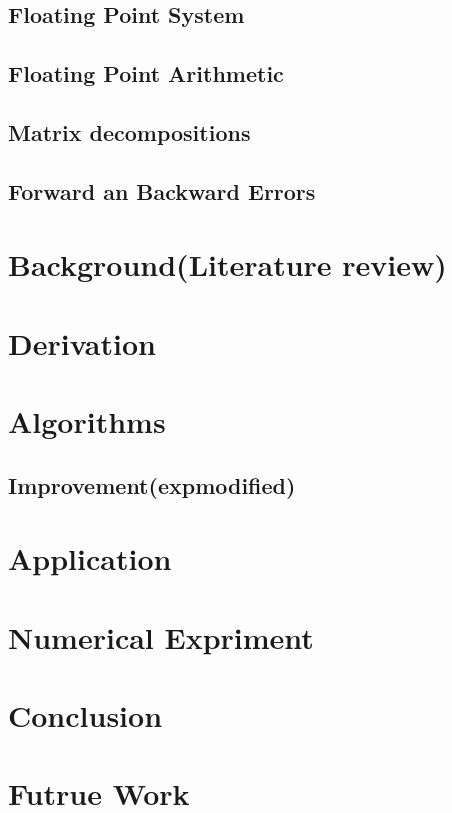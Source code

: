 \documentclass[11pt]{article}
\begin{document}
\subsection{Floating Point System}

\subsection{Floating Point Arithmetic}

\subsection{Matrix decompositions}

\subsection{Forward an Backward Errors}


\section{Background(Literature review)}

\section{Derivation}


\section{Algorithms}


\subsection{Improvement(expmodified)}

\section{Application}


\section{Numerical Expriment}


\section{Conclusion}

\section{Futrue Work}
\end{document}
